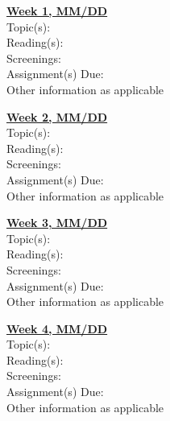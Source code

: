 \documentclass[12pt]{article} %
\begin{document}
\noindent \textbf{\underline{Week 1, MM/DD}}
\vspace{0.3em} \\
Topic(s): \\
Reading(s): \\
Screenings: \\
Assignment(s) Due: \\
Other information as applicable

\vspace{0.5em}

\noindent \textbf{\underline{Week 2, MM/DD}}
\vspace{0.3em} \\
Topic(s): \\
Reading(s): \\
Screenings: \\
Assignment(s) Due: \\
Other information as applicable

\vspace{0.5em}

\noindent \textbf{\underline{Week 3, MM/DD}}
\vspace{0.3em} \\
Topic(s): \\
Reading(s): \\
Screenings: \\
Assignment(s) Due: \\
Other information as applicable

\vspace{0.5em}

\noindent \textbf{\underline{Week 4, MM/DD}}
\vspace{0.3em} \\
Topic(s): \\
Reading(s): \\
Screenings: \\
Assignment(s) Due: \\
Other information as applicable

\vspace{0.5em}


\vspace{0.5em}
\end{document}
